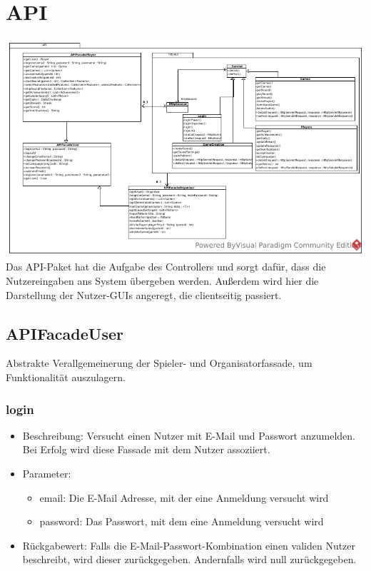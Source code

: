 \documentclass[a4paper]{scrreprt}
\begin{document}
	\section{API}
	\includegraphics[width=\textwidth]{img/package/api.pdf}
	Das API-Paket hat die Aufgabe des Controllers und sorgt dafür, dass die Nutzereingaben ans System übergeben werden. Außerdem wird hier die Darstellung der Nutzer-GUIs angeregt, die clientseitig passiert.
	
	\subsection{APIFacadeUser}
	Abstrakte Verallgemeinerung der Spieler- und Organisatorfassade, um Funktionalität auszulagern.
	\subsubsection{login}
		\begin{itemize}
			\item Beschreibung: Versucht einen Nutzer mit E-Mail und Passwort anzumelden. Bei Erfolg wird diese Fassade mit dem Nutzer assoziiert.
			\item Parameter:
			\begin{itemize}
				\item email: Die E-Mail Adresse, mit der eine Anmeldung versucht wird
				\item password: Das Passwort, mit dem eine Anmeldung versucht wird
			\end{itemize}
			\item Rückgabewert: Falls die E-Mail-Passwort-Kombination einen validen Nutzer beschreibt, wird dieser zurückgegeben. Andernfalls wird null zurückgegeben.
		\end{itemize}
\end{document}
